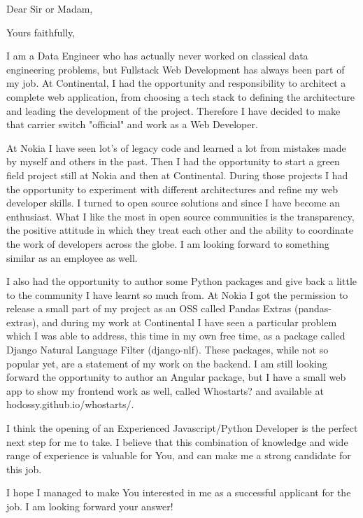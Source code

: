 \documentclass[11pt,a4paper,sans,english]{moderncv}        %
\begin{document}
\clearpage
\date{\today}%
\opening{Dear Sir or Madam,}%
\closing{Yours faithfully,}%
\makelettertitle
I am a Data Engineer who has actually never worked on classical data engineering problems, but Fullstack Web Development has always been part of my job. At Continental, I had the opportunity and responsibility to architect a complete web application, from choosing a tech stack to defining the architecture and leading the development of the project. Therefore I have decided to make that carrier switch "official" and work as a Web Developer.

At Nokia I have seen lot's of legacy code and learned a lot from mistakes made by myself and others in the past. Then I had the opportunity to start a green field project still at Nokia and then at Continental. During those projects I had the opportunity to experiment with different architectures and refine my web developer skills. I turned to open source solutions and since I have become an enthusiast. What I like the most in open source communities is the transparency, the positive attitude in which they treat each other and the ability to coordinate the work of developers across the globe. I am looking forward to something similar as an employee as well.

I also had the opportunity to author some Python packages and give back a little to the community I have learnt so much from. At Nokia I got the permission to release a small part of my project as an OSS called Pandas Extras (pandas-extras), and during my work at Continental I have seen a particular problem which I was able to address, this time in my own free time, as a package called Django Natural Language Filter (django-nlf). These packages, while not so popular yet, are a statement of my work on the backend. I am still looking forward the opportunity to author an Angular package, but I have a small web app to show my frontend work as well, called Whostarts? and available at hodossy.github.io/whostarts/.

I think the opening of an Experienced Javascript/Python Developer is the perfect next step for me to take. I believe that this combination of knowledge and wide range of experience is valuable for You, and can make me a strong candidate for this job.

I hope I managed to make You interested in me as a successful applicant for the job. I am looking forward your answer!

\makeletterclosing
\end{document}
